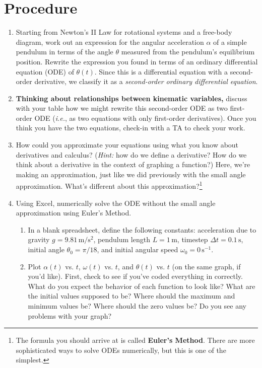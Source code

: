 \documentclass{article}
\begin{document}
\section{Procedure}
\begin{enumerate}
    \item Starting from Newton’s II Law for rotational systems and a free-body diagram, work out an expression for the angular acceleration $\alpha$ of a simple pendulum in terms of the angle $\theta$ measured from the pendulum’s equilibrium position. Rewrite the expression you found in terms of an ordinary differential equation (ODE) of $\theta(t)$. Since this is a differential equation with a second-order derivative, we classify it as a \textit{second-order ordinary differential equation}.
    \item \textbf{Thinking about relationships between kinematic variables,} discuss with your table how we might rewrite this second-order ODE as two first-order ODE (\textit{i.e.}, as two equations with only first-order derivatives). Once you think you have the two equations, check-in with a TA to check your work.
    \item How could you approximate your equations using what you know about derivatives and calculus? (\textit{Hint:} how do we define a derivative? How do we think about a derivative in the context of graphing a function?) Here, we’re making an approximation, just like we did previously with the small angle approximation. What’s different about this approximation?\footnote{The formula you should arrive at is called \textbf{Euler’s Method}. There are more sophisticated ways to solve ODEs numerically, but this is one of the simplest.}
    \item Using Excel, numerically solve the ODE without the small angle approximation using Euler’s Method. 
    \begin{enumerate}
        \item In a blank spreadsheet, define the following constants: acceleration due to gravity $g = 9.81\,\mathrm{m/s^2}$, pendulum length $L = 1\,\mathrm{m}$, timestep $\Delta t = 0.1 \,\mathrm{s}$, initial angle $\theta_0 = \pi/18$, and initial angular speed $\omega_0 = 0\,\mathrm{s^{-1}}$.
        \item Plot $\alpha(t)$ vs. $t$, $\omega(t)$ vs. $t$, and $\theta(t)$ vs. $t$ (on the same graph, if you'd like). First, check to see if you’ve coded everything in correctly. What do you expect the behavior of each function to look like? What are the initial values supposed to be? Where should the maximum and minimum values be? Where should the zero values be? Do you see any problems with your graph?

\end{enumerate}
\end{enumerate}
\end{document}
